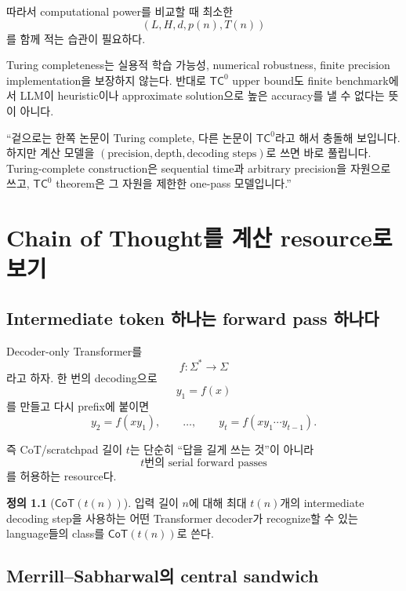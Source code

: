 \documentclass[11pt,a4paper,oneside,openany]{memoir}
\theoremstyle{definition}
\newtheorem{definition}{정의}[chapter]
\newcommand{\TC}{\mathsf{TC}}
\newcommand{\CoT}{\mathsf{CoT}}
\begin{document}
따라서 computational power를 비교할 때 최소한
\[
(L,H,d,p(n),T(n))
\]
를 함께 적는 습관이 필요하다.

\begin{warningbox}
Turing completeness는 실용적 학습 가능성, numerical robustness, finite precision implementation을 보장하지 않는다. 반대로 $\TC^0$ upper bound도 finite benchmark에서 LLM이 heuristic이나 approximate solution으로 높은 accuracy를 낼 수 없다는 뜻이 아니다.
\end{warningbox}

\begin{presentbox}
``겉으로는 한쪽 논문이 Turing complete, 다른 논문이 $\TC^0$라고 해서 충돌해 보입니다. 하지만 계산 모델을 $(\text{precision},\text{depth},\text{decoding steps})$로 쓰면 바로 풀립니다. Turing-complete construction은 sequential time과 arbitrary precision을 자원으로 쓰고, $\TC^0$ theorem은 그 자원을 제한한 one-pass 모델입니다.''
\end{presentbox}

\chapter{Chain of Thought를 계산 resource로 보기}

\section{Intermediate token 하나는 forward pass 하나다}

Decoder-only Transformer를
\[
f:\Sigma^*\to\Sigma
\]
라고 하자. 한 번의 decoding으로
\[
y_1=f(x)
\]
를 만들고 다시 prefix에 붙이면
\[
y_2=f(xy_1),\qquad
\dots,\qquad y_t=f(xy_1\cdots y_{t-1}).
\]

즉 CoT/scratchpad 길이 $t$는 단순히 ``답을 길게 쓰는 것''이 아니라
\[
\boxed{t\text{번의 serial forward passes}}
\]
를 허용하는 resource다.

\begin{definition}[$\CoT(t(n))$]
입력 길이 $n$에 대해 최대 $t(n)$개의 intermediate decoding step을 사용하는 어떤 Transformer decoder가 recognize할 수 있는 language들의 class를 $\CoT(t(n))$로 쓴다.
\end{definition}

\section{Merrill--Sabharwal의 central sandwich}
\end{document}
